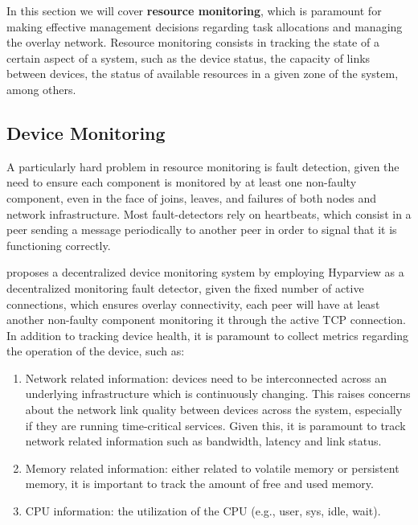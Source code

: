 
In this section we will cover \textbf{resource monitoring}, which is paramount for making effective management decisions regarding task allocations and managing the overlay network. Resource monitoring consists in tracking the state of a certain aspect of a system, such as the device status, the capacity of links between devices, the status of available resources in a given zone of the system, among others. 

\subsection{Device Monitoring}

A particularly hard problem in resource monitoring is fault detection, given the need to ensure each component is monitored by at least one non-faulty component, even in the face of joins, leaves, and failures of both nodes and network infrastructure. Most fault-detectors rely on heartbeats, which consist in a peer sending a message periodically to another peer in order to signal that it is functioning correctly.

\textcite{leitao2008large} proposes a decentralized device monitoring system by employing Hyparview \cite{Hyparview} as a decentralized monitoring fault detector, given the fixed number of active connections, which ensures overlay connectivity, each peer will have at least another non-faulty component monitoring it through the active TCP connection. In addition to tracking device health, it is paramount to collect metrics regarding the operation of the device, such as:

\begin{enumerate}

    \item Network related information: devices need to be interconnected across an underlying infrastructure which is continuously changing. This raises concerns about the network link quality between devices across the system, especially if they are running time-critical services. Given this, it is paramount to track network related information such as bandwidth, latency and link status.
    
    \item Memory related information: either related to volatile memory or persistent memory, it is important to track the amount of free and used memory.
    
    \item CPU information: the utilization of the CPU (e.g., user, sys, idle, wait).
    
\end{enumerate}

